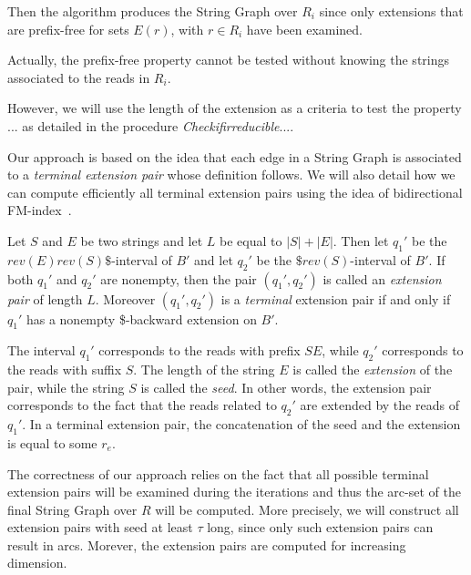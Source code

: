 \documentclass[runningheads,envcountsame,a4paper]{llncs}
\begin{document}
Then the algorithm produces the String Graph over $R_i$ since only
extensions that are prefix-free for sets $E(r)$, with $r \in R_i$ have
been examined.

Actually, the prefix-free property cannot be tested without knowing the
strings associated to the reads in $R_i$.

 However, we will use the length of the extension as a criteria to test
the property ... as detailed in the procedure
\emph{Checkifirreducible}....


Our approach is based on the idea that each edge in a String Graph is
associated to a \emph{terminal extension pair} whose definition follows.
We will also detail how we can compute efficiently all terminal extension pairs
using the idea of bidirectional FM-index~\cite{Lam2009}.

\begin{definition}\label{def:extension-pair}
Let $S$ and $E$ be two strings and let $L$ be equal to $|S|+|E|$.
Then let $q_{1}'$ be the $rev(E)rev(S)\$$-interval of $B'$ and let  $q_{2}'$ be the $\$rev(S)$-interval of $B'$.
If both $q_{1}'$ and  $q_{2}'$ are nonempty, then the pair  $(q_{1}', q_{2}')$ is called
an \emph{extension pair} of length $L$.
Moreover $(q_{1}', q_{2}')$ is a \emph{terminal} extension pair
if and only if $q_{1}'$ has a nonempty \$-backward extension on $B'$.
\end{definition}

The interval $q_{1}'$ corresponds to the reads with prefix $SE$, while $q_{2}'$
corresponds to the reads with suffix $S$.
The length of the string $E$ is called the \emph{extension} of the
pair, while the string $S$ is called the \emph{seed}.
In other words, the extension pair corresponds to the fact that the reads related to $q_{2}'$ are extended by the reads
of $q_{1}'$.
In a terminal extension pair, the concatenation of the seed and the extension is
equal to some $r_{e}$.

The correctness of our approach relies on the fact that all possible
terminal extension pairs will be examined during the iterations and thus
the arc-set of the final String Graph over $R$ will be computed.
More precisely, we will construct all extension pairs with seed at least $\tau$ long, since only such extension pairs can result in arcs.
Morever, the extension pairs are computed for increasing dimension.
\end{document}
